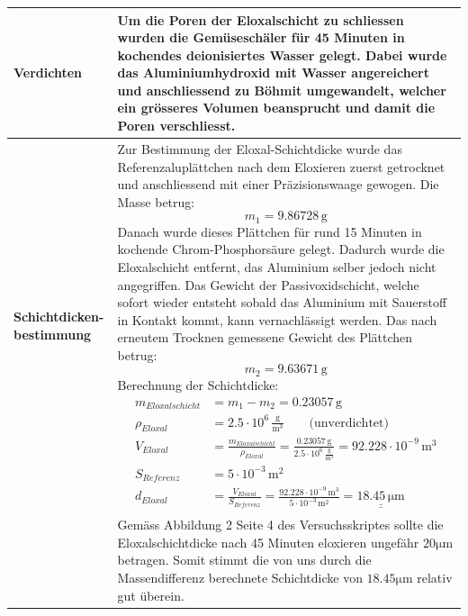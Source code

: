 \begin{longtable}{p{3cm}p{14cm}}
    \textbf{Verdichten}
    & Um die Poren der Eloxalschicht zu schliessen wurden die Gemüseschäler für 45 Minuten in kochendes deionisiertes Wasser gelegt. Dabei wurde das Aluminiumhydroxid mit Wasser angereichert und anschliessend zu Böhmit umgewandelt, welcher ein grösseres Volumen beansprucht und damit die Poren verschliesst.\\
    \hline
    
    \textbf{Schichtdicken-bestimmung}
    & Zur Bestimmung der Eloxal-Schichtdicke wurde das Referenzaluplättchen nach dem Eloxieren zuerst getrocknet und anschliessend mit einer Präzisionswaage gewogen. Die Masse betrug: $$ m_1 = 9.86728 \, \mathrm{g}$$
    Danach wurde dieses Plättchen für rund 15 Minuten in kochende Chrom-Phosphorsäure gelegt. Dadurch wurde die Eloxalschicht entfernt, das Aluminium selber jedoch nicht angegriffen. Das Gewicht der Passivoxidschicht, welche sofort wieder entsteht sobald das Aluminium mit Sauerstoff in Kontakt kommt, kann vernachlässigt werden. Das nach erneutem Trocknen gemessene Gewicht des Plättchen betrug: $$ m_2 = 9.63671 \, \mathrm{g}$$
    Berechnung der Schichtdicke:
    $$ \begin{aligned}
            m_{Eloxalschicht} &= m_1 - m_2 = 0.23057 \, \mathrm{g}\\
            \rho_{Eloxal} &= 2.5\cdot 10^{6} \, \frac{\mathrm{g}}{\mathrm{m}^3} \qquad \text{(unverdichtet)}\\
            V_{Eloxal} &= \frac{m_{Eloxalschicht}}{\rho_{Eloxal}} = \frac{0.23057 \, \mathrm{g}}{2.5\cdot 10^{6} \, \frac{\mathrm{g}}{\mathrm{m}^3}} = 92.228 \cdot 10^{-9} \, \mathrm{m^3}\\
            S_{Referenz} &= 5 \cdot 10^{-3} \, \mathrm{m^2}\\
            d_{Eloxal} &= \frac{V_{Eloxal}}{S_{Referenz}} = \frac{92.228 \cdot 10^{-9} \, \mathrm{m^3}}{5 \cdot 10^{-3} \, \mathrm{m^2}}= \underline{\underline{18.45 \, \mathrm{\mu m}}}
       \end{aligned}$$\\
    & Gemäss Abbildung 2 Seite 4 des Versuchsskriptes sollte die Eloxalschichtdicke nach 45 Minuten eloxieren ungefähr $20 \mathrm{\mu m}$ betragen. Somit stimmt die von uns durch die Massendifferenz berechnete Schichtdicke von $18.45 \mathrm{\mu m}$ relativ gut überein.\\
    \hline
\end{longtable}

